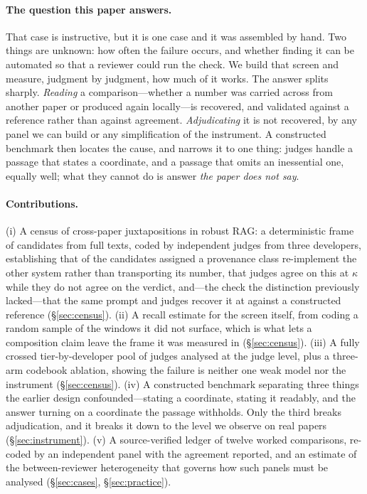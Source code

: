\documentclass[11pt]{article}
\begin{document}
\paragraph{The question this paper answers.}
That case is instructive, but it is one case and it was assembled by hand. Two
things are unknown: how often the failure occurs, and whether finding it can be
automated so that a reviewer could run the check. We build that screen and
measure, judgment by judgment, how much of it works. The answer splits sharply.
\emph{Reading} a comparison---whether a number was carried across from another
paper or produced again locally---is recovered, and validated against a
reference rather than against agreement. \emph{Adjudicating} it is not
recovered, by any panel we can build or any simplification of the instrument. A
constructed benchmark then locates the cause, and narrows it to one thing:
judges handle a passage that states a coordinate, and a passage that omits an
inessential one, equally well; what they cannot do is answer \emph{the paper
does not say}.

\paragraph{Contributions.}
(i) A census of cross-paper juxtapositions in robust RAG: a deterministic frame
of \FrameCandidates{} candidates from \FrameScreened{} full texts, coded by
independent judges from three developers, establishing that
\ProvReimplemented{} of the \ProvClassified{} candidates assigned a provenance
class re-implement the other system rather than transporting its number, that
judges agree on this at $\kappa$ \DecProvK{} while they do not agree on the
verdict, and---the check the distinction previously lacked---that the same
prompt and judges recover it at \PvAcc{} \PvAccCI{} against a constructed
reference (\S\ref{sec:census}).
(ii) A recall estimate for the screen itself, from coding a random sample of the
windows it did not surface, which is what lets a composition claim leave the
frame it was measured in (\S\ref{sec:census}).
(iii) A fully crossed tier-by-developer pool of \TierPanelN{} judges analysed at
the judge level, plus a three-arm codebook ablation, showing the failure is
neither one weak model nor the instrument (\S\ref{sec:census}).
(iv) A constructed benchmark separating three things the earlier design
confounded---stating a coordinate, stating it readably, and the answer turning
on a coordinate the passage withholds. Only the third breaks adjudication, and
it breaks it down to the level we observe on real papers
(\S\ref{sec:instrument}).
(v) A source-verified ledger of twelve worked comparisons, re-coded by an
independent panel with the agreement reported, and an estimate of the
between-reviewer heterogeneity that governs how such panels must be analysed
(\S\ref{sec:cases}, \S\ref{sec:practice}).
\end{document}
